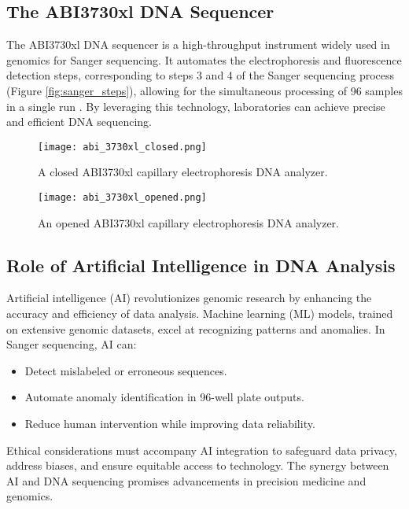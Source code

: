 \subsection{The ABI3730xl DNA Sequencer}
The ABI3730xl DNA sequencer is a high-throughput instrument widely used in genomics for Sanger sequencing. It automates the electrophoresis and fluorescence detection steps, corresponding to steps 3 and 4 of the Sanger sequencing process (Figure \ref{fig:sanger_steps}), allowing for the simultaneous processing of 96 samples in a single run \cite{smith_capillary_sequencing,abi3730xl_overview}. By leveraging this technology, laboratories can achieve precise and efficient DNA sequencing. 
\begin{figure}[h]
\centering
\texttt{[image: abi\_3730xl\_closed.png]}
\caption{A closed ABI3730xl capillary electrophoresis DNA analyzer.}
\label{fig:abi_3730xl_closed}
\end{figure}

\begin{figure}[h]
\centering
\texttt{[image: abi\_3730xl\_opened.png]}
\caption{An opened ABI3730xl capillary electrophoresis DNA analyzer.}
\label{fig:abi_3730xl_opened}
\end{figure}


\subsection{Role of Artificial Intelligence in DNA Analysis}
Artificial intelligence (AI) revolutionizes genomic research by enhancing the accuracy and efficiency of data analysis. Machine learning (ML) models, trained on extensive genomic datasets, excel at recognizing patterns and anomalies. In Sanger sequencing, AI can:
\begin{itemize}
\item Detect mislabeled or erroneous sequences.
\item Automate anomaly identification in 96-well plate outputs.
\item Reduce human intervention while improving data reliability.
\end{itemize}

Ethical considerations must accompany AI integration to safeguard data privacy, address biases, and ensure equitable access to technology. The synergy between AI and DNA sequencing promises advancements in precision medicine and genomics.

